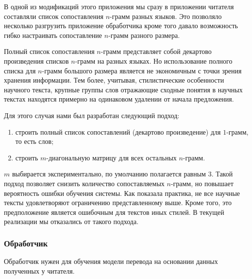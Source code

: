 В одной из модификаций этого приложения мы сразу в приложении читателя составляли список сопоставления
$n$-грамм разных языков. Это позволяло несколько разгрузить приложение обработчика кроме того давало
возможность гибко настраивать сопоставление $n$-грамм разного размера.

Полный список сопоставления $n$-грамм представляет собой декартово произведения списков $n$-грамм
на разных языках. Но использование полного списка для $n$-грамм  большого размера является 
не экономичным с точки зрения хранения информации. Тем более, учитывая, стилистические особенности
научного текста, крупные группы слов отражающие сходные понятия в научных текстах находятся
примерно на одинаковом удалении от начала предложения.

Для этого случая нами был разработан следующий подход:
{\renewcommand{\labelenumi}{\alph{enumi})}
	\begin{enumerate}
		\item строить полный список сопоставлений (декартово произведение) для $1$-грамм, то есть слов;
		\item строить $m$-диагональную матрицу для всех остальных $n$-грамм.
	\end{enumerate}
}
$m$ выбирается экспериментально, по умолчанию полагается равным $3$.
Такой подход позволяет снизить количество сопоставляемых $n$-грамм, но повышает вероятность
ошибки обучения системы. 
Как показала практика, не все научные тексты удовлетворяют ограничению представленному выше.
Кроме того, это предположение является ошибочным для текстов иных стилей.
В текущей реализации мы отказались от такого подхода.

\pagebreak

\subsubsection{Обработчик}
Обработчик нужен для обучения модели перевода на основании данных полученных у читателя.

